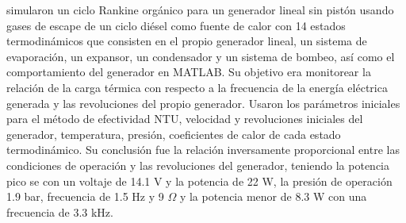 
\textcite{XU2018776} simularon un ciclo Rankine orgánico para un generador lineal sin pistón usando gases de escape de un ciclo diésel como fuente de calor con 14 estados termodinámicos que consisten en el propio generador lineal, un sistema de evaporación, un expansor, un condensador y un sistema de bombeo, así como  el comportamiento del generador en MATLAB. Su objetivo era monitorear la relación de la carga térmica con respecto a la frecuencia de la energía eléctrica generada y las revoluciones del propio generador. Usaron los parámetros iniciales para el método de efectividad NTU, velocidad y revoluciones iniciales del generador, temperatura, presión, coeficientes de calor de cada estado termodinámico. Su conclusión fue la relación inversamente proporcional entre las condiciones de operación y las revoluciones del generador, teniendo la potencia pico se con un voltaje de 14.1 V y la potencia de 22 W, la presión de operación 1.9 bar, frecuencia de 1.5 Hz y 9 $\Omega$ y la potencia menor de 8.3 W con una frecuencia de 3.3 kHz.

